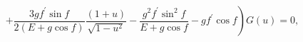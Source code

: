 \begin{equation}
\label{OD1}
\left.
+ \frac{3 g f^{\prime} \sin f}{2 \left(E + g \cos f \right)} 
\frac{(1+u)}{\sqrt{1-u^2}} 
- \frac{g^2 f^\prime \sin^2 f}{E + g \cos f} - g f^\prime \cos f
\right) G(u) = 0, 
\end{equation}

